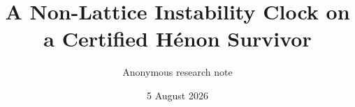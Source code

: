 \documentclass[11pt]{article}
\title{A Non-Lattice Instability Clock on a Certified H\'enon Survivor}
\author{Anonymous research note}
\date{5 August 2026}
\theoremstyle{definition}
\theoremstyle{remark}
\begin{document}
\maketitle

\begin{abstract}

\end{abstract}










\clearpage
\appendix



\begingroup
\small


\endgroup
\end{document}
